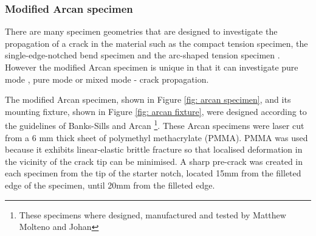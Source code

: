 \documentclass[12pt,oneside,openany,a4paper, %
english, %
masters-t, goldenblock]{usthesis}
\newcommand{\RomanNumeralCaps}[1]
    {\MakeUppercase{\romannumeral #1}}
\begin{document}
\subsubsection{Modified Arcan specimen}
There are many specimen geometries that are designed to investigate the propagation of a crack in the material such as the compact tension specimen, the single-edge-notched bend specimen and the arc-shaped tension specimen \cite{astm2012standard}. However the modified Arcan specimen is unique in that it can investigate pure mode \RomanNumeralCaps{1}, pure mode \RomanNumeralCaps{2} or mixed mode \RomanNumeralCaps{1}-\RomanNumeralCaps{2} crack propagation.

The modified Arcan specimen, shown in Figure \ref{fig: arcan specimen}, and its mounting fixture, shown in Figure \ref{fig: arcan fixture}, were designed according to the guidelines of Banks-Sills and Arcan \cite{banks1986compact} \footnote{These specimens where designed, manufactured and tested by Matthew Molteno and Johan}. These Arcan specimens were laser cut from a 6 mm thick sheet of polymethyl methacrylate (PMMA). PMMA was used because it exhibits linear-elastic brittle fracture so that localised deformation in the vicinity of the crack tip can be minimised. A sharp pre-crack was created in each specimen from the tip of the starter notch, located 15mm from the filleted edge of the specimen, until 20mm from the filleted edge. 
\end{document}
